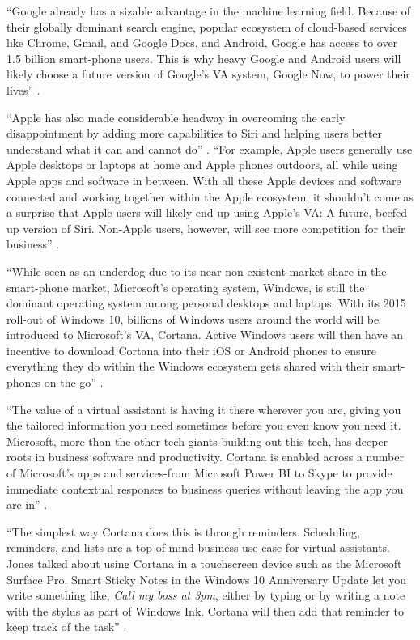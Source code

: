 ``Google already has a sizable advantage in the machine learning field. Because of their globally dominant search engine, popular ecosystem of cloud-based services like Chrome, Gmail, and Google Docs, and Android, Google has access to over 1.5 billion smart-phone users. This is why heavy Google and Android users will likely choose a future version of Google's VA system, Google Now, to power their lives'' \cite{Tal2015internet}.

``Apple has also made considerable headway in overcoming the early disappointment by adding more capabilities to Siri and helping users better understand what it can and cannot do'' \cite{Waters2015life}. ``For example, Apple users generally use Apple desktops or laptops at home and Apple phones outdoors, all while using Apple apps and software in between. With all these Apple devices and software connected and working together within the Apple ecosystem, it shouldn't come as a surprise that Apple users will likely end up using Apple's VA: A future, beefed up version of Siri. Non-Apple users, however, will see more competition for their business'' \cite{Tal2015internet}.

``While seen as an underdog due to its near non-existent market share in the smart-phone market, Microsoft's operating system, Windows, is still the dominant operating system among personal desktops and laptops. With its 2015 roll-out of Windows 10, billions of Windows users around the world will be introduced to Microsoft's VA, Cortana. Active Windows users will then have an incentive to download Cortana into their iOS or Android phones to ensure everything they do within the Windows ecosystem gets shared with their smart-phones on the go'' \cite{Tal2015internet}.

``The value of a virtual assistant is having it there wherever you are, giving you the tailored information you need sometimes before you even know you need it. Microsoft, more than the other tech giants building out this tech, has deeper roots in business software and productivity. Cortana is enabled across a number of Microsoft's apps and services-from Microsoft Power BI to Skype to provide immediate contextual responses to business queries without leaving the app you are in'' \cite{Marvin2017them}.

``The simplest way Cortana does this is through reminders. Scheduling, reminders, and lists are a top-of-mind business use case for virtual assistants. Jones talked about using Cortana in a touchscreen device such as the Microsoft Surface Pro. Smart Sticky Notes in the Windows 10 Anniversary Update let you write something like, {\em Call my boss at 3pm}, either by typing or by writing a note with the stylus as part of Windows Ink. Cortana will then add that reminder to keep track of the task'' \cite{Marvin2017them}.

